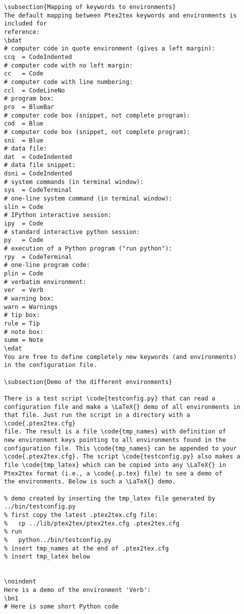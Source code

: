 \documentclass[a4paper,11pt]{article}
\begin{document}
{{{{{{{{{{{\begin{Verbatim}
\subsection{Mapping of keywords to environments}
The default mapping between Ptex2tex keywords and environments is included for
reference:
\bdat
# computer code in quote environment (gives a left margin):
ccq  = CodeIndented
# computer code with no left margin:
cc   = Code
# computer code with line numbering:
ccl  = CodeLineNo
# program box:
pro  = BlueBar
# computer code box (snippet, not complete program):
cod  = Blue
# computer code box (snippet, not complete program):
sni  = Blue
# data file:
dat  = CodeIndented
# data file snippet:
dsni = CodeIndented
# system commands (in terminal window):
sys  = CodeTerminal
# one-line system command (in terminal window):
slin = Code
# IPython interactive session:
ipy  = Code
# standard interactive python session:
py   = Code
# execution of a Python program ("run python"):
rpy  = CodeTerminal
# one-line program code:
plin = Code
# verbatim environment:
ver  = Verb
# warning box:
warn = Warnings
# tip box:
rule = Tip
# note box:
summ = Note
\edat
You are free to define completely new keywords (and environments)
in the configuration file.

\subsection{Demo of the different environments}

There is a test script \code{testconfig.py} that can read a
configuration file and make a \LaTeX{} demo of all environments in
that file. Just run the script in a directory with a \code{.ptex2tex.cfg}
file. The result is a file \code{tmp_names} with definition of
new environment keys pointing to all environments found in the
configuration file. This \code{tmp_names} can be appended to your
\code{.ptex2tex.cfg}. The script \code{testconfig.py} also makes a
file \code{tmp_latex} which can be copied into any \LaTeX{} in
Ptex2tex format (i.e., a \code{.p.tex} file) to see a demo of
the environments. Below is such a \LaTeX{} demo.

% demo created by inserting the tmp_latex file generated by ../bin/testconfig.py
% first copy the latest .ptex2tex.cfg file:
%   cp ../lib/ptex2tex/ptex2tex.cfg .ptex2tex.cfg
% run 
%   python../bin/testconfig.py
% insert tmp_names at the end of .ptex2tex.cfg
% insert tmp_latex below


\noindent
Here is a demo of the environment 'Verb':
\bn1
# Here is some short Python code


\end{Verbatim}}}}}}}}}}}}
\end{document}
